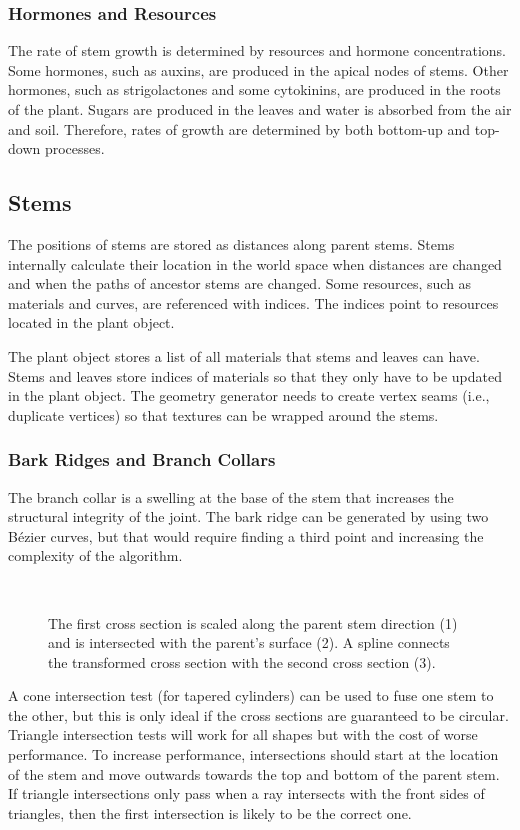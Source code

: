 \documentclass[10pt]{article}
\begin{document}
\subsubsection{Hormones and Resources}
The rate of stem growth is determined by resources and hormone concentrations. Some hormones, such as auxins, are produced in the apical nodes of stems. Other hormones, such as strigolactones and some cytokinins, are produced in the roots of the plant. Sugars are produced in the leaves and water is absorbed from the air and soil. Therefore, rates of growth are determined by both bottom-up and top-down processes.

\subsection{Stems}
The positions of stems are stored as distances along parent stems. Stems internally calculate their location in the world space when distances are changed and when the paths of ancestor stems are changed. Some resources, such as materials and curves, are referenced with indices. The indices point to resources located in the plant object.

The plant object stores a list of all materials that stems and leaves can have. Stems and leaves store indices of materials so that they only have to be updated in the plant object. The geometry generator needs to create vertex seams (i.e., duplicate vertices) so that textures can be wrapped around the stems.

\subsubsection{Bark Ridges and Branch Collars}
The branch collar is a swelling at the base of the stem that increases the structural integrity of the joint. The bark ridge can be generated by using two B\'{e}zier curves, but that would require finding a third point and increasing the complexity of the algorithm.

\begin{figure}[H]
 \centering
  \\
 \caption{The first cross section is scaled along the parent stem direction (1) and is intersected with the parent's surface (2). A spline connects the transformed cross section with the second cross section (3).}
\end{figure}

A cone intersection test (for tapered cylinders) can be used to fuse one stem to the other, but this is only ideal if the cross sections are guaranteed to be circular. Triangle intersection tests will work for all shapes but with the cost of worse performance. To increase performance, intersections should start at the location of the stem and move outwards towards the top and bottom of the parent stem. If triangle intersections only pass when a ray intersects with the front sides of triangles, then the first intersection is likely to be the correct one.
\end{document}
